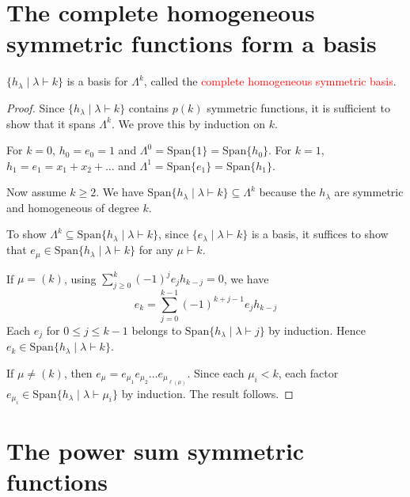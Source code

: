 \documentclass[12pt]{memoir}
\begin{document}
\newpage

\section{The complete homogeneous symmetric functions form a basis}

\begin{ptcb}
\begin{Prop}
$\{h_\lambda \mid \lambda \vdash k\}$ is a basis for $\Lambda^k$, called the \textcolor{red}{complete homogeneous symmetric basis}.
\end{Prop}
\end{ptcb}

\begin{proof}
Since $\{h_\lambda \mid \lambda \vdash k\}$ contains $p(k)$ symmetric functions, it is sufficient to show that it spans $\Lambda^k$. We prove this by induction on $k$.

For $k = 0$, $h_0 = e_0 = 1$ and $\Lambda^0 = \text{Span}\{1\} = \text{Span}\{h_0\}$. For $k = 1$, $h_1 = e_1 = x_1 + x_2 + \dots$ and $\Lambda^1 = \text{Span}\{e_1\} = \text{Span}\{h_1\}$.

Now assume $k \ge 2$. We have $\text{Span}\{h_\lambda \mid \lambda \vdash k\} \subseteq \Lambda^k$ because the $h_\lambda$ are symmetric and homogeneous of degree $k$.

To show $\Lambda^k \subseteq \text{Span}\{h_\lambda \mid \lambda \vdash k\}$, since $\{e_\lambda \mid \lambda \vdash k\}$ is a basis, it suffices to show that $e_\mu \in \text{Span}\{h_\lambda \mid \lambda \vdash k\}$ for any $\mu \vdash k$.

If $\mu = (k)$, using $\sum_{j \ge 0}^k (-1)^j e_j h_{k-j} = 0$, we have
\[
e_k = \sum_{j=0}^{k-1} (-1)^{k+j-1} e_j h_{k-j}
\]
Each $e_j$ for $0 \le j \le k-1$ belongs to $\text{Span}\{h_\lambda \mid \lambda \vdash j\}$ by induction. Hence $e_k \in \text{Span}\{h_\lambda \mid \lambda \vdash k\}$.

If $\mu \neq (k)$, then $e_\mu = e_{\mu_1} e_{\mu_2} \dots e_{\mu_{\ell(\mu)}}$. Since each $\mu_i < k$, each factor $e_{\mu_i} \in \text{Span}\{h_\lambda \mid \lambda \vdash \mu_i\}$ by induction. The result follows.
\end{proof}

\newpage

\section{The power sum symmetric functions}
\end{document}
